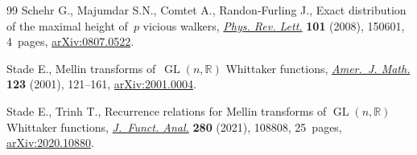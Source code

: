 \documentclass[pdftex]{sigma}
\theoremstyle{definition}
\begin{document}
\begin{thebibliography}{99}
Schehr G., Majumdar S.N., Comtet A., Randon-Furling J., Exact distribution of
 the maximal height of~{$p$} vicious walkers,
 \href{https://doi.org/10.1103/PhysRevLett.101.150601}{\textit{Phys. Rev.
 Lett.}} \textbf{101} (2008), 150601, 4~pages,
 \href{http://arxiv.org/abs/0807.0522}{arXiv:0807.0522}.

Stade E., Mellin transforms of~{$\operatorname{GL}(n,\mathbb R)$} {W}hittaker
 functions, \href{https://doi.org/10.1353/ajm.2001.0004}{\textit{Amer.~J.
 Math.}} \textbf{123} (2001), 121--161,
 \href{http://arxiv.org/abs/2001.0004}{arXiv:2001.0004}.

Stade E., Trinh T., Recurrence relations for {M}ellin transforms of
 {$\operatorname{GL}(n,\mathbb R)$} {W}hittaker functions,
 \href{https://doi.org/10.1016/j.jfa.2020.108808}{\textit{J.~Funct. Anal.}}
 \textbf{280} (2021), 108808, 25~pages,
 \href{http://arxiv.org/abs/2020.10880}{arXiv:2020.10880}.

\end{thebibliography} \LastPageEnding
\end{document}
